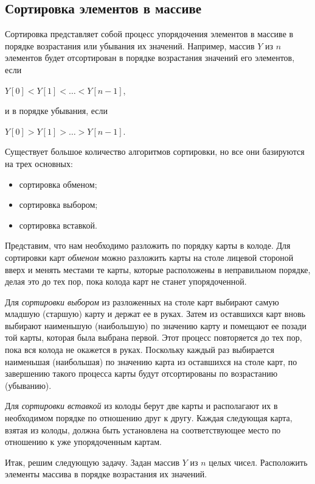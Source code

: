 \subsection[Сортировка элементов в массиве]{Сортировка элементов в массиве}
Сортировка представляет собой процесс упорядочения элементов в массиве в
порядке возрастания или убывания их значений. Например, массив $Y$ из $n$ элементов
будет отсортирован в порядке возрастания значений его элементов, если

 $Y[0]<Y[1]<{\dots}<Y[n-1]$,

и в порядке убывания, если

 $Y[0]>Y[1]>{\dots}>Y[n-1]$.

Существует большое количество алгоритмов сортировки, но все они базируются на трех основных:

\begin{itemize}
\item сортировка обменом;
\item сортировка выбором;
\item сортировка вставкой.
\end{itemize}

Представим, что нам необходимо разложить по порядку карты в колоде. Для сортировки карт \emph{обменом} можно разложить
карты на столе лицевой стороной вверх и менять местами те карты, которые расположены в неправильном порядке, делая это
до тех пор, пока колода карт не станет упорядоченной.

Для \emph{сортировки выбором} из разложенных на столе карт выбирают самую младшую (старшую) карту и держат ее в руках.
Затем из оставшихся карт вновь выбирают наименьшую (наибольшую) по значению карту и помещают ее позади той карты,
которая была выбрана первой. Этот процесс повторяется до тех пор, пока вся колода не окажется в руках. Поскольку каждый
раз выбирается наименьшая (наибольшая) по значению карта из оставшихся на столе карт, по завершению такого процесса
карты будут отсортированы по возрастанию (убыванию).

Для \emph{сортировки вставкой} из колоды берут две карты и располагают их в необходимом порядке по отношению друг к
другу. Каждая следующая карта, взятая из колоды, должна быть установлена на соответствующее место по отношению к уже
упорядоченным картам.

Итак, решим следующую задачу. Задан массив $Y$ из $n$ целых чисел. Расположить элементы массива в порядке возрастания их
значений.

